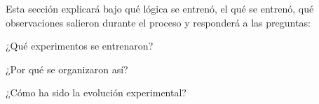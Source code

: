 Esta sección explicará bajo qué lógica se entrenó, el qué se entrenó, qué observaciones salieron durante el proceso y responderá a las preguntas:


¿Qué experimentos se entrenaron? 

¿Por qué se organizaron así? 

¿Cómo ha sido la evolución experimental?

